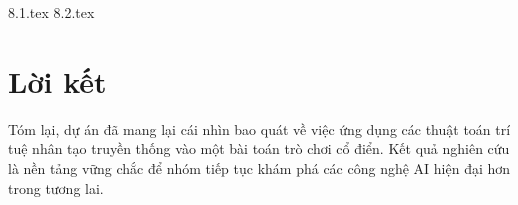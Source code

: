 {8.1.tex}
{8.2.tex}

\section{Lời kết}
Tóm lại, dự án đã mang lại cái nhìn bao quát về việc ứng dụng các thuật toán trí tuệ nhân tạo truyền thống vào một bài toán trò chơi cổ điển. Kết quả nghiên cứu là nền tảng vững chắc để nhóm tiếp tục khám phá các công nghệ AI hiện đại hơn trong tương lai.
